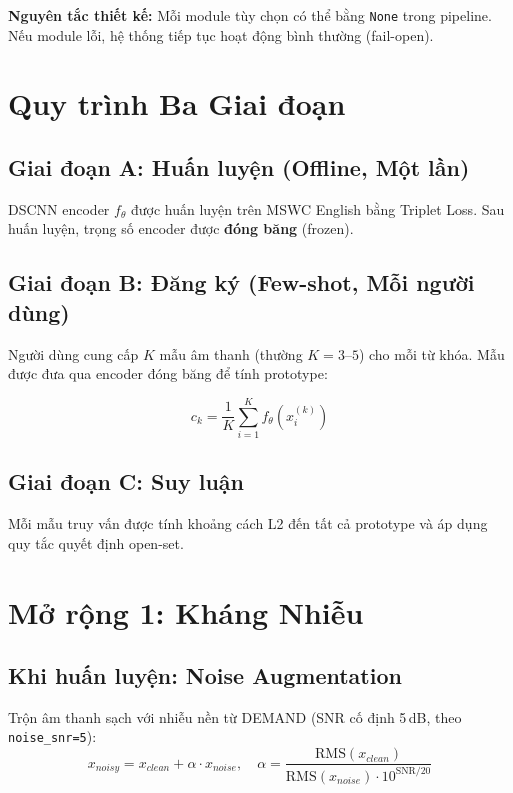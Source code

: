\documentclass[12pt,a4paper]{report}
\begin{document}
\textbf{Nguyên tắc thiết kế:} Mỗi module tùy chọn có thể bằng \texttt{None}
trong pipeline. Nếu module lỗi, hệ thống tiếp tục hoạt động bình thường
(fail-open).


\section{Quy trình Ba Giai đoạn}

\subsection{Giai đoạn A: Huấn luyện (Offline, Một lần)}

DSCNN encoder $f_\theta$ được huấn luyện trên MSWC English bằng Triplet Loss.
Sau huấn luyện, trọng số encoder được \textbf{đóng băng} (frozen).

\subsection{Giai đoạn B: Đăng ký (Few-shot, Mỗi người dùng)}

Người dùng cung cấp $K$ mẫu âm thanh (thường $K = 3$--$5$) cho mỗi từ khóa.
Mẫu được đưa qua encoder đóng băng để tính prototype:

\begin{equation}
    c_k = \frac{1}{K} \sum_{i=1}^{K} f_\theta(x_i^{(k)})
\end{equation}

\subsection{Giai đoạn C: Suy luận}

Mỗi mẫu truy vấn được tính khoảng cách L2 đến tất cả prototype và áp dụng
quy tắc quyết định open-set.


\section{Mở rộng 1: Kháng Nhiễu}

\subsection{Khi huấn luyện: Noise Augmentation}

Trộn âm thanh sạch với nhiễu nền từ DEMAND (SNR cố định 5\,dB, theo \texttt{noise\_snr=5}):
\begin{equation}
    x_{noisy} = x_{clean} + \alpha \cdot x_{noise}, \quad
    \alpha = \frac{\text{RMS}(x_{clean})}{\text{RMS}(x_{noise}) \cdot 10^{\text{SNR}/20}}
\end{equation}
\end{document}
